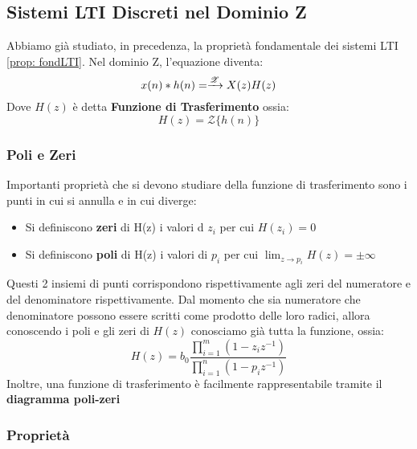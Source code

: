 \subsection{Sistemi LTI Discreti nel Dominio Z}
Abbiamo già studiato, in precedenza, la proprietà fondamentale dei sistemi LTI \eqref{prop: fondLTI}. Nel dominio Z, l'equazione diventa:
\begin{equation}
    x(n) \ast h(n) = \xrightarrow{\mathscr{Z}} X(z)H(z)
\end{equation}
Dove $H(z)$ è detta \textbf{Funzione di Trasferimento} ossia:
\begin{equation}
    H(z) = \mathscr{Z}\{h(n)\}
\end{equation}
\subsubsection{Poli e Zeri}
Importanti proprietà che si devono studiare della funzione di trasferimento sono i punti in cui si annulla e in cui diverge:
\begin{itemize}
    \item Si definiscono \textbf{zeri} di H(z) i valori d $z_i$ per cui $H(z_i) = 0$
    \item Si definiscono \textbf{poli} di H(z) i valori di $p_i$ per cui $\lim_{z \to p_i} H(z) = \pm \infty$
\end{itemize}
Questi 2 insiemi di punti corrispondono rispettivamente agli zeri del numeratore e del denominatore rispettivamente. Dal momento
che sia numeratore che denominatore possono essere scritti come prodotto delle loro radici, allora conoscendo i poli e gli zeri di $H(z)$
conosciamo già tutta la funzione, ossia:
\begin{equation}
    H(z) = b_0\frac{\prod_{i = 1}^{m}(1 - z_iz^{-1})}{\prod_{i = 1}^{n}(1 - p_iz^{-1})}
\end{equation}
Inoltre, una funzione di trasferimento è facilmente rappresentabile tramite il \textbf{diagramma poli-zeri}

\subsubsection{Proprietà}
